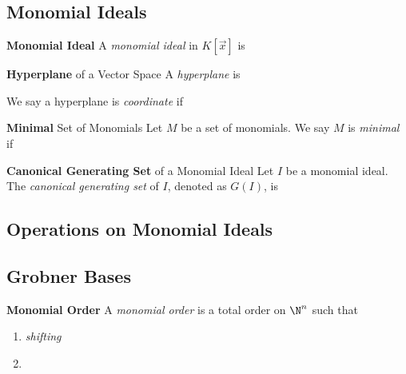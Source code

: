 \documentclass[11pt]{article}
\begin{document}
    \subsection{Monomial Ideals}
    
    \begin{definition}{\textbf{Monomial Ideal}}
        A \emph{monomial ideal} in $K\left[ \vec{x} \right]$ is 
    \end{definition}

    \begin{definition}{\textbf{Hyperplane} of a Vector Space}
        A \emph{hyperplane} is 

        We say a hyperplane is \emph{coordinate} if 
    \end{definition}
    
    \begin{definition}{\textbf{Minimal} Set of Monomials}
        Let $M$ be a set of monomials. We say $M$ is \emph{minimal} if 
    \end{definition}
    
    \begin{definition}{\textbf{Canonical Generating Set} of a Monomial Ideal}
        Let $I$ be a monomial ideal. The \emph{canonical generating set} of $I$, denoted as $G\left( I \right)$, is
    \end{definition}
    
    \subsection{Operations on Monomial Ideals}
    
    \subsection{Grobner Bases}

    \begin{definition}{\textbf{Monomial Order}}
        A \emph{monomial order} is a total order on $\N^n$ such that
        \begin{enumerate}
            \item \hfill\textit{shifting}
            \item
        \end{enumerate}
    \end{definition}
\end{document}
